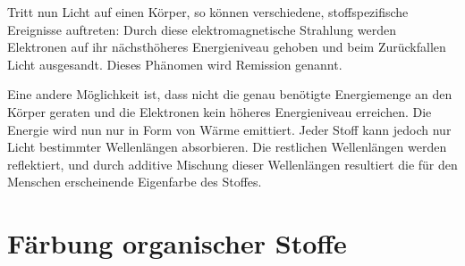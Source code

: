 \documentclass[11pt]{scrreprt}
\begin{document}
Tritt nun Licht auf einen Körper, so können verschiedene, stoffspezifische Ereignisse auftreten: Durch diese elektromagnetische Strahlung werden Elektronen auf ihr nächsthöheres Energieniveau gehoben und beim Zurückfallen Licht ausgesandt. Dieses Phänomen wird Remission genannt. 

Eine andere Möglichkeit ist, dass nicht die genau benötigte Energiemenge an den Körper geraten und die Elektronen kein höheres Energieniveau erreichen. Die Energie wird nun nur in Form von Wärme emittiert. Jeder Stoff kann jedoch nur Licht bestimmter Wellenlängen absorbieren. Die restlichen Wellenlängen werden reflektiert, und durch additive Mischung dieser Wellenlängen resultiert die für den Menschen erscheinende Eigenfarbe des Stoffes\parencite[S.9-15]{Jenette.1983}.

\section{Färbung organischer Stoffe}
\end{document}
